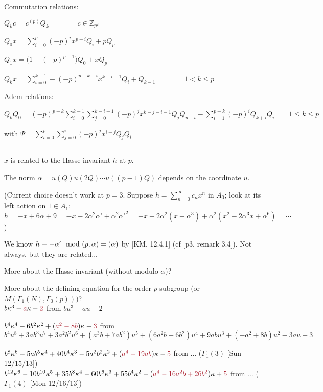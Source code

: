 \documentclass{rs}
\theoremstyle{definition}
\theoremstyle{remark}
\newcommand{\mb}[1]{\mathbb{#1}}
\newcommand{\BZ}{{\mb Z}}
\newcommand{\md}{~~{\rm mod}~}
\newcommand{\A}{\alpha}
\newcommand{\G}{\Gamma}
\newcommand{\K}{\kappa}
\numberwithin{equation}{section}
\numberwithin{thm}{section}
\begin{document}
Commutation relations:

$Q_k c = c^{(p)} Q_k \qquad \qquad c \in \BZ_{p^2}$

$\displaystyle Q_0 x = \sum_{i=0}^p (-p)^i x^{p-i} Q_i + p Q_p$

$Q_1 x = \big( 1- (-p)^{p-1} \big) Q_0 + x Q_p$

$\displaystyle Q_k x = \sum_{i=0}^{k-1} -(-p)^{p-k+i} x^{k-i-1} Q_i + Q_{k-1} \qquad \qquad 1 < k \leq p$

Adem relations:

$\displaystyle Q_k Q_0 = (-p)^{p-k} \sum_{i=0}^{k-1} \sum_{j=0}^{k-i-1} (-p)^j x^{k-j-i-1} Q_j Q_{p-i} - \sum_{i=1}^{p-k} (-p)^i Q_{k+i} Q_i \qquad 1 \leq k \leq p$ 

with $\displaystyle \Psi = \sum_{i=0}^p \sum_{j=0}^i (-p)^j x^{i-j} Q_j Q_i$ \\

\hrule

$x$ is related to the Hasse invariant $h$ at $p$.  

The norm $\A = u(Q) u(2Q) \cdots u((p-1)Q)$ depends on the coordinate $u$.  

(Current choice doesn't work at $p = 3$.  
Suppose $h = \sum_{n=0}^\infty c_n x^n$ in $A_0$; look at its left action on $1 \in A_1$: \\
$h = -x + 6 \A + 9 = -x - 2 \A^2 \A' + \A^2 \A'^2 = -x - 2 \A^2 (x - \A^3) + \A^2 (x^2 - 2 \A^3 x + \A^6) = \cdots$) 

We know $h \equiv -\A' \md (p,\A) = (\A)$ by [KM, 12.4.1] (cf [p3, remark 3.4]).  Not always, but they are related... 

More about the Hasse invariant (without modulo $\A$)?  

More about the defining equation for the order $p$ subgroup (or $M(\G_1(N),\G_0(p))$)?  \\
$b \K^3 - \textcolor{Maroon}{a} \K - \textcolor{Maroon}{2}$ from $b u^3 - a u - 2$ 

$b^4 \K^4 - 6 b^2 \K^2 + (\textcolor{Maroon}{a^2 - 8 b}) \K - \textcolor{Maroon}{3}$ 
from $b^4 u^8 + 3 a b^3 u^7 + 3 a^2 b^2 u^6 + (a^3 b + 7 a b^2) u^5 + (6 a^2 b - 6 b^2) u^4 + 9 a b u^3 + (-a^2 + 8 b) u^2 - 3 a u - 3$ 

\vspace{-.9 cm}
\begin{equation}
\label{p=5}
\end{equation}
$b^8 \K^6 - 5 a b^5 \K^4 + 40 b^4 \K^3 - 5 a^2 b^2 \K^2 + (\textcolor{Maroon}{a^4 - 19 a b}) \K - \textcolor{Maroon}{5}$ 
from $\ldots$ ($\G_1(3)$ [Sun-12/15/13]) \\
$b^{12} \K^6 - 10 b^{10} \K^5 + 35 b^8 \K^4 - 60 b^6 \K^3 + 55 b^4 \K^2 - (\textcolor{Maroon}{a^4 - 16 a^2 b + 26 b^2}) \K + \textcolor{Maroon}{5}$ 
from $\ldots$ ($\G_1(4)$ [Mon-12/16/13]) 
\end{document}
